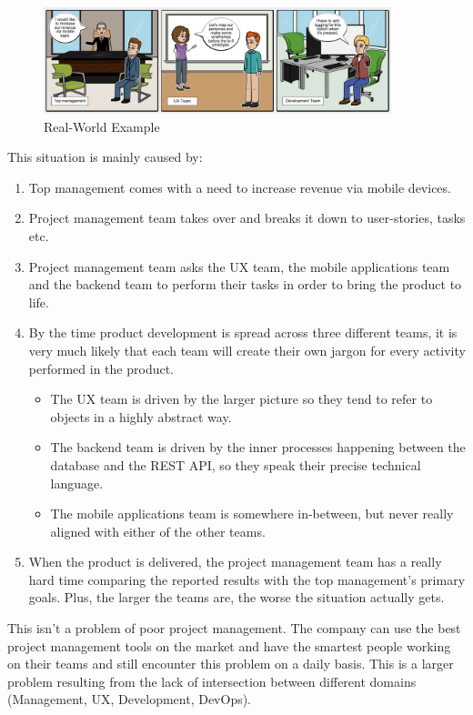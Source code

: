 \begin{figure}[!ht]
	\centering
	\includegraphics[width=0.9\textwidth]{figures/01_introduction/storyboard}
    \caption{Real-World Example}
\end{figure}

This situation is mainly caused by:

\begin{enumerate}
	\item Top management comes with a need to increase revenue via mobile devices.
	\item Project management team takes over and breaks it down to user-stories, tasks etc.
	\item Project management team asks the UX team, the mobile applications team and the backend team to perform their tasks in order to bring the product to life.
	\item By the time product development is spread across three different teams, it is very much likely that each team will create their own jargon for every activity performed in the product.
		\begin{itemize}
			\item The UX team is driven by the larger picture so they tend to refer to objects in a highly abstract way.
			\item The backend team is driven by the inner processes happening between the \\ database and the REST API, so they speak their precise technical language.
			\item The mobile applications team is somewhere in-between, but never really aligned with either of the other teams.
		\end{itemize}
	\item When the product is delivered, the project management team has a really hard time comparing the reported results with the top management's primary goals. Plus, the larger the teams are, the worse the situation actually gets.
\end{enumerate}

This isn't a problem of poor project management. The company can use the best project management tools on the market and have the smartest people working on their teams and still encounter this problem on a daily basis. This is a larger problem resulting from the lack of intersection between different domains (Management, UX, Development, DevOps).

